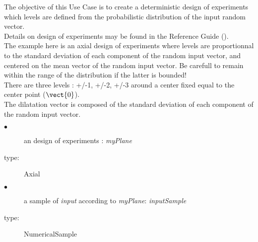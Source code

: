 \renewcommand{\filename}{docUC_MinMax_MixedDetRandExperimentPlane.tex}
\renewcommand{\filetitle}{UC : Creation of a mixed deterministic / random design of experiments }

\HeaderIIILevel

\label{determRandomExpPlane}


The objective of this Use Case is to  create a deterministic design of experiments  which levels are defined from the probabilistic distribution of the input random vector.\\


Details on design of experiments   may be found in the Reference Guide ().\\

The example here is an axial design of experiments  where levels are proportionnal to the standard deviation of each component of the random input vector, and centered on the mean vector of the random input vector. Be carefull to remain within the range of the distribution if the latter is bounded!\\
There are three levels  : +/-1, +/-2, +/-3 around a center fixed equal to the center point ($\vect{0}$).\\
The dilatation vector is composed of the standard deviation of each component of the random input vector.\\

             {
               \begin{description}
               \item[$\bullet$] an design of experiments  : {\itshape myPlane}
               \item[type:] Axial
               \item[$\bullet$] a sample of {\itshape input} according to {\itshape myPlane}: {\itshape inputSample}
               \item[type:] NumericalSample
               \end{description}
             }

